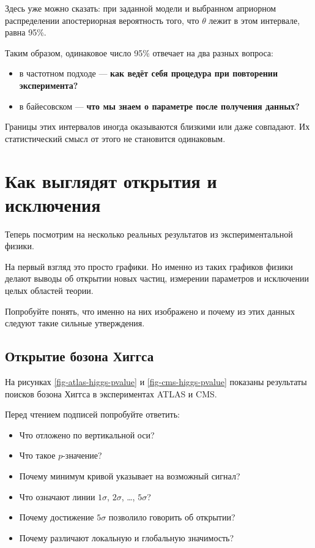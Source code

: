 \documentclass[
  russian,
  11pt,
  a4paper,
  open=any]{scrbook}
\providecommand{\tightlist}{%
  \setlength{\itemsep}{0pt}\setlength{\parskip}{0pt}}
\begin{document}
Здесь уже можно сказать: при заданной модели и выбранном априорном
распределении апостериорная вероятность того, что \(\theta\) лежит в
этом интервале, равна 95\%.

Таким образом, одинаковое число 95\% отвечает на два разных вопроса:

\begin{itemize}
\tightlist
\item
  в частотном подходе --- \textbf{как ведёт себя процедура при
  повторении эксперимента?}
\item
  в байесовском --- \textbf{что мы знаем о параметре после получения
  данных?}
\end{itemize}

Границы этих интервалов иногда оказываются близкими или даже совпадают.
Их статистический смысл от этого не становится одинаковым.

\section{Как выглядят открытия и
исключения}\label{ux43aux430ux43a-ux432ux44bux433ux43bux44fux434ux44fux442-ux43eux442ux43aux440ux44bux442ux438ux44f-ux438-ux438ux441ux43aux43bux44eux447ux435ux43dux438ux44f}

Теперь посмотрим на несколько реальных результатов из экспериментальной
физики.

На первый взгляд это просто графики. Но именно из таких графиков физики
делают выводы об открытии новых частиц, измерении параметров и
исключении целых областей теории.

Попробуйте понять, что именно на них изображено и почему из этих данных
следуют такие сильные утверждения.

\subsection{Открытие бозона
Хиггса}\label{ux43eux442ux43aux440ux44bux442ux438ux435-ux431ux43eux437ux43eux43dux430-ux445ux438ux433ux433ux441ux430}

На рисунках \ref{fig-atlas-higgs-pvalue} и \ref{fig-cms-higgs-pvalue}
показаны результаты поисков бозона Хиггса в экспериментах ATLAS и CMS.

Перед чтением подписей попробуйте ответить:

\begin{itemize}
\tightlist
\item
  Что отложено по вертикальной оси?
\item
  Что такое \(p\)-значение?
\item
  Почему минимум кривой указывает на возможный сигнал?
\item
  Что означают линии \(1\sigma\), \(2\sigma\), \ldots, \(5\sigma\)?
\item
  Почему достижение \(5\sigma\) позволило говорить об открытии?
\item
  Почему различают локальную и глобальную значимость?
\end{itemize}
\end{document}
